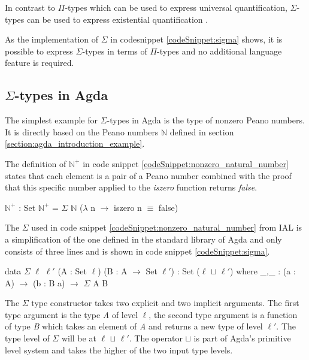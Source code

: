 In contrast to $\Pi$-types which can be used to express universal quantification, $\Sigma$-types can be used to express existential quantification \cite{plfa2019}.

As the implementation of $\Sigma$ in codesnippet \ref{codeSnippet:sigma} shows, it is possible to express $\Sigma$-types in terms of $\Pi$-types and no additional language feature is required.

\subsection{$\Sigma$-types in Agda}
The simplest example for $\Sigma$-types in Agda is the type of nonzero Peano numbers.
It is directly based on the Peano numbers $\mathbb{N}$ defined in section \ref{section:agda_introduction_example}.

The definition of $\mathbb{N}^+$ in code snippet \ref{codeSnippet:nonzero_natural_number} states that each element is a pair of a Peano number combined with the proof that this specific number applied to the \emph{iszero} function returns \emph{false}.

\begin{codesnippet}[mathescape=true, caption={Definition of nonzero Peano numbers in Agda}, label={codeSnippet:nonzero_natural_number}]
$\mathbb{N}^+$ : Set
$\mathbb{N}^+$ = $\Sigma$ $\mathbb{N}$ ($\lambda$ n $\rightarrow$ iszero n $\equiv$ false)
\end{codesnippet}

The $\Sigma$ used in code snippet \ref{codeSnippet:nonzero_natural_number} from IAL is a simplification of the one defined in the standard library of Agda and only consists of three lines and is shown in code snippet \ref{codeSnippet:sigma}.

\begin{codesnippet}[mathescape=true, caption={Definition of $\Sigma$ in Agda}, label={codeSnippet:sigma}]
data $\Sigma$ {$\ell$ $\ell '$} (A : Set $\ell$) (B : A $\rightarrow$ Set $\ell '$)
 : Set ($\ell$ $\sqcup$ $\ell '$) where
_,_ : (a : A) $\rightarrow$ (b : B a) $\rightarrow$ $\Sigma$ A B
\end{codesnippet}

The $\Sigma$ type constructor takes two explicit and two implicit arguments. 
The first type argument is the type \emph{A} of level $\ell$, the second type argument is a function of type \emph{B} which takes an element of \emph{A} and returns a new type of level $\ell '$.
The type level of $\Sigma$ will be at $\ell$ $\sqcup$ $\ell '$. The operator $\sqcup$ is part of Agda's primitive level system and takes the higher of the two input type levels.

